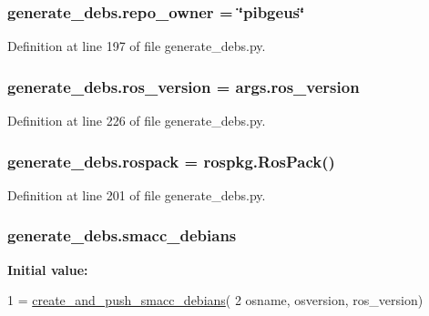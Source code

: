 \subsubsection[{\texorpdfstring{repo\+\_\+owner}{repo_owner}}]{\setlength{\rightskip}{0pt plus 5cm}generate\+\_\+debs.\+repo\+\_\+owner = \char`\"{}pibgeus\char`\"{}}\hypertarget{namespacegenerate__debs_a23479dba5af50c90f3346b04d441ab2b}{}\label{namespacegenerate__debs_a23479dba5af50c90f3346b04d441ab2b}


Definition at line 197 of file generate\+\_\+debs.\+py.

\subsubsection[{\texorpdfstring{ros\+\_\+version}{ros_version}}]{\setlength{\rightskip}{0pt plus 5cm}generate\+\_\+debs.\+ros\+\_\+version = args.\+ros\+\_\+version}\hypertarget{namespacegenerate__debs_af69f35c2a04a4cc8bd6b9805ab436872}{}\label{namespacegenerate__debs_af69f35c2a04a4cc8bd6b9805ab436872}


Definition at line 226 of file generate\+\_\+debs.\+py.

\subsubsection[{\texorpdfstring{rospack}{rospack}}]{\setlength{\rightskip}{0pt plus 5cm}generate\+\_\+debs.\+rospack = rospkg.\+Ros\+Pack()}\hypertarget{namespacegenerate__debs_a609fa33c1ebbff173ec90524eeb7b49d}{}\label{namespacegenerate__debs_a609fa33c1ebbff173ec90524eeb7b49d}


Definition at line 201 of file generate\+\_\+debs.\+py.

\subsubsection[{\texorpdfstring{smacc\+\_\+debians}{smacc_debians}}]{\setlength{\rightskip}{0pt plus 5cm}generate\+\_\+debs.\+smacc\+\_\+debians}\hypertarget{namespacegenerate__debs_a06e0eca4f9d50e67f110b439c402ef44}{}\label{namespacegenerate__debs_a06e0eca4f9d50e67f110b439c402ef44}
{\bfseries Initial value\+:}
\begin{DoxyCode}
1 = \hyperlink{namespacegenerate__debs_af7237c463c8e5b4df369e6befc154c50}{create\_and\_push\_smacc\_debians}(
2         osname, osversion, ros\_version)
\end{DoxyCode}


